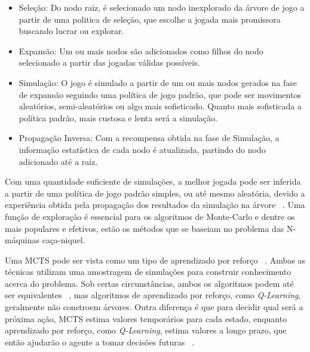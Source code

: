 \begin{itemize}

   \item Seleção: Do nodo raiz, é selecionado um nodo inexplorado da árvore de jogo a partir de uma politica de seleção, que escolhe a jogada mais promissora buscando lucrar ou explorar.
   
   \item Expansão: Um ou mais nodos são adicionados como filhos do nodo selecionado a partir das jogadas válidas possíveis.
   
   \item Simulação: O jogo é simulado a partir de um ou mais nodos gerados na fase de expansão seguindo uma política de jogo padrão, que pode ser movimentos aleatórios, semi-aleatórios ou algo mais sofisticado. Quanto mais sofisticada a política padrão, mais custosa e lenta será a simulação.
   
   \item Propagação Inversa: Com a recompensa obtida na fase de Simulação, a informação estatística de cada nodo é atualizada, partindo do nodo adicionado até a raiz.
   
\end{itemize}

Com uma quantidade suficiente de simulações, a melhor jogada pode ser inferida a partir de uma política de jogo padrão simples, ou até mesmo aleatória, devido a experiência obtida pela propagação dos resultados da simulação na árvore ~\cite{MONTECARLOSURVEY}. Uma função de exploração é essencial para os algoritmos de Monte-Carlo e dentre os mais populares e efetivos, estão os métodos que se baseiam no problema das N-máquinas caça-niquel.




   
   

Uma MCTS pode ser vista como um tipo de aprendizado por reforço ~\cite{MONTECARLOSURVEY}. Ambas as técnicas utilizam uma amostragem de simulações para construir conhecimento acerca do problema. Sob certas circunstâncias, ambos os algoritmos podem até ser equivalentes ~\cite{MONTECARLOREINFORCEMENTEQ}, mas algoritmos de aprendizado por reforço, como \textit{Q-Learning}, geralmente não constroem árvores. Outra diferença é que para decidir qual será a próxima ação, MCTS estima valores temporários para cada estado, enquanto aprendizado por reforço, como \textit{Q-Learning}, estima valores a longo prazo, que então ajudarão o agente a tomar decisões futuras ~\cite{MONTECARLOSURVEY}.

